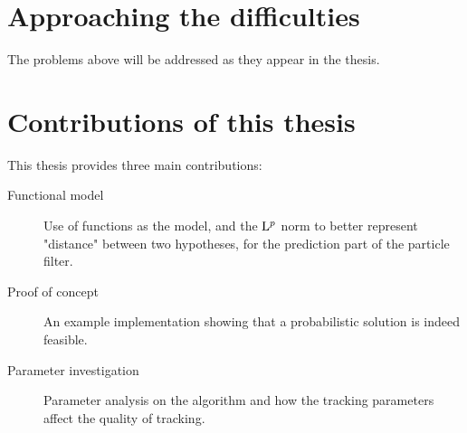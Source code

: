 \section{Approaching the difficulties}
The problems above will be addressed as they appear in the thesis.

\section{Contributions of this thesis}
This thesis provides three main contributions:
\begin{description}
\item[Functional model] Use of functions as the model, and the $\mathrm{L}^{p}$
  norm to better represent "distance" between two hypotheses, for the
  prediction part of the particle filter.
\item[Proof of concept] An example implementation showing that a
  probabilistic solution is indeed feasible.
\item[Parameter investigation] Parameter analysis on the algorithm and
  how the tracking parameters affect the quality of tracking.

\end{description}
